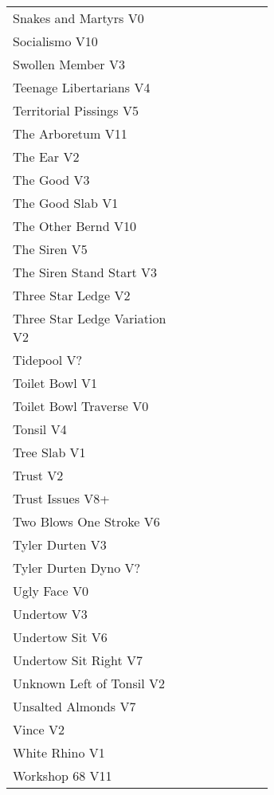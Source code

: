 \begin{center}
\begin{supertabular}{p{0.65\linewidth}r}
Snakes and Martyrs V0 & \pageref{rt:Snakes and Martyrs} \\
Socialismo V10 & \pageref{rt:Socialismo} \\
Swollen Member V3 & \pageref{rt:Swollen Member} \\
Teenage Libertarians V4 & \pageref{rt:Teenage Libertarians} \\
Territorial Pissings V5 & \pageref{rt:Territorial Pissings} \\
The Arboretum V11 & \pageref{rt:The Arboretum} \\
The Ear V2 & \pageref{rt:The Ear} \\
The Good V3 & \pageref{rt:The Good} \\
The Good Slab V1 & \pageref{rt:The Good Slab} \\
The Other Bernd V10 & \pageref{rt:The Other Bernd} \\
The Siren V5 & \pageref{rt:The Siren} \\
The Siren Stand Start V3 & \pageref{vr:The Siren Stand Start} \\
Three Star Ledge V2 & \pageref{rt:Three Star Ledge} \\
Three Star Ledge Variation V2 & \pageref{vr:Three Star Ledge Variation} \\
Tidepool V? & \pageref{rt:Tidepool} \\
Toilet Bowl V1 & \pageref{rt:Toilet Bowl} \\
Toilet Bowl Traverse V0 & \pageref{rt:Toilet Bowl Traverse} \\
Tonsil V4 & \pageref{rt:Tonsil} \\
Tree Slab V1 & \pageref{rt:Tree Slab} \\
Trust V2 & \pageref{rt:Trust} \\
Trust Issues V8+ & \pageref{rt:Trust Issues} \\
Two Blows One Stroke V6 & \pageref{rt:Two Blows One Stroke} \\
Tyler Durten V3 & \pageref{rt:Tyler Durten} \\
Tyler Durten Dyno V? & \pageref{vr:Tyler Durten Dyno} \\
Ugly Face V0 & \pageref{rt:Ugly Face} \\
Undertow V3 & \pageref{rt:Undertow} \\
Undertow Sit V6 & \pageref{vr:Undertow Sit} \\
Undertow Sit Right V7 & \pageref{vr:Undertow Sit Right} \\
Unknown Left of Tonsil V2 & \pageref{rt:Unknown Left of Tonsil} \\
Unsalted Almonds V7 & \pageref{rt:Unsalted Almonds} \\
Vince V2 & \pageref{rt:Vince} \\
White Rhino V1 & \pageref{rt:White Rhino} \\
Workshop 68 V11 & \pageref{rt:Workshop 68} \\
\end{supertabular}
\end{center}
